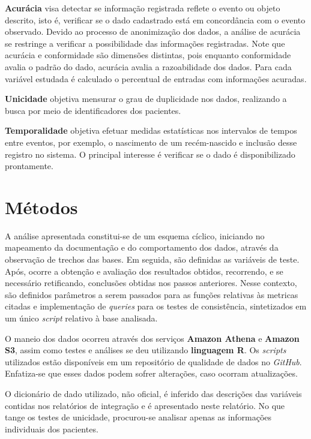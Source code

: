 \documentclass[
  12,
  table]{proadi}
\begin{document}
\textbf{Acurácia} visa detectar se informação registrada reflete o
evento ou objeto descrito, isto é, verificar se o dado cadastrado está
em concordância com o evento observado. Devido ao processo de
anonimização dos dados, a análise de acurácia se restringe a verificar a
possibilidade das informações registradas. Note que acurácia e
conformidade são dimensões distintas, pois enquanto conformidade avalia
o padrão do dado, acurácia avalia a razoabilidade dos dados. Para cada
variável estudada é calculado o percentual de entradas com informações
acuradas.

\textbf{Unicidade} objetiva mensurar o grau de duplicidade nos dados,
realizando a busca por meio de identificadores dos pacientes.

\textbf{Temporalidade} objetiva efetuar medidas estatísticas nos
intervalos de tempos entre eventos, por exemplo, o nascimento de um
recém-nascido e inclusão desse registro no sistema. O principal
interesse é verificar se o dado é disponibilizado prontamente.

\renewcommand{\arraystretch}{1.25}

\renewcommand{\arraystretch}{1}

\hypertarget{muxe9todos}{%
\section{Métodos}\label{muxe9todos}}

A análise apresentada constitui-se de um esquema cíclico, iniciando no
mapeamento da documentação e do comportamento dos dados, através da
observação de trechos das bases. Em seguida, são definidas as variáveis
de teste. Após, ocorre a obtenção e avaliação dos resultados obtidos,
recorrendo, e se necessário retificando, conclusões obtidas nos passos
anteriores. Nesse contexto, são definidos parâmetros a serem passados
para as funções relativas às metricas citadas e implementação de
\emph{queries} para os testes de consistência, sintetizados em um único
\emph{script} relativo à base analisada.

O maneio dos dados ocorreu através dos serviços \textbf{Amazon Athena} e
\textbf{Amazon S3}, assim como testes e análises se deu utilizando
\textbf{linguagem R}. Os \emph{scripts} utilizados estão disponíveis em
um repositório de qualidade de dados no \emph{GitHub}. Enfatiza-se que
esses dados podem sofrer alterações, caso ocorram atualizações.

O dicionário de dado utilizado, não oficial, é inferido das descrições
das variáveis contidas nos relatórios de integração e é apresentado
neste relatório. No que tange os testes de unicidade, procurou-se
analisar apenas as informações individuais dos pacientes.
\end{document}
